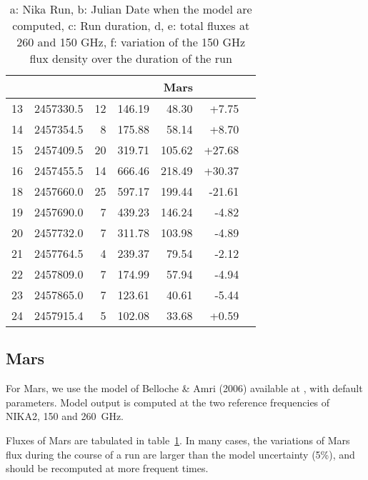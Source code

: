 \begin{table}[p]
\begin{tabular}{|l|r|r|r|r|r|r|}
\hline
         &    &            & \multicolumn{3}{|c|}{Mars}\\
\hline
13 & 2457330.5 &  12 & 146.19 & 48.30 & +7.75\\
14 & 2457354.5 &  8 & 175.88 & 58.14 & +8.70\\
15 & 2457409.5 &  20 & 319.71 & 105.62 & +27.68\\
16 & 2457455.5 &  14 & 666.46 & 218.49 & +30.37\\
18 & 2457660.0 &  25 & 597.17 & 199.44 & -21.61\\
19 & 2457690.0 &  7 & 439.23 & 146.24 & -4.82\\
20 & 2457732.0 &  7 & 311.78 & 103.98 & -4.89\\
21 & 2457764.5 &  4 & 239.37 & 79.54 & -2.12\\
22 & 2457809.0 &  7 & 174.99 & 57.94 & -4.94\\
23 & 2457865.0 &  7 & 123.61 & 40.61 & -5.44\\
24 & 2457915.4 &  5 & 102.08 & 33.68 & +0.59 \\
\hline
\end{tabular}
\caption[NIKA2 Planet flux expectations]{ a: Nika Run, b: Julian Date when the
  model are computed, c: Run duration, d, e: total fluxes at 260 and
  150 GHz, f: variation of the 150 GHz flux density over the duration
  of the run}
\label{tab:fluxPred}
\end{table}


\subsection{Mars}
For Mars, we use the model of Belloche \&  Amri (2006) available at
\cite{beloche},
with default parameters. Model output is computed at the two reference
frequencies of NIKA2, 150 and 260~GHz.

Fluxes of Mars are tabulated in table~\ref{tab:fluxPred}. In many
cases, the variations of Mars flux during the course of a run are
larger than the model uncertainty (5\%), and should be recomputed at
more frequent times. 


